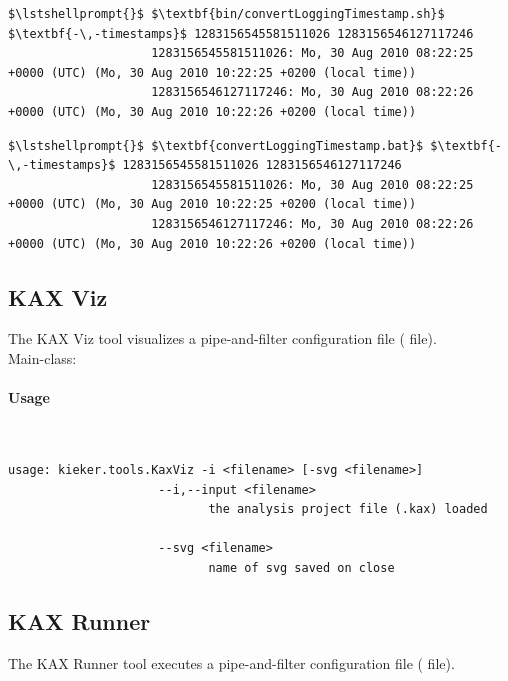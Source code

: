 				\setTextListing
				\begin{lstlisting}[gobble = 10, caption=Execution under UNIX-like systems]
					$\lstshellprompt{}$ $\textbf{bin/convertLoggingTimestamp.sh}$ $\textbf{-\,-timestamps}$ 1283156545581511026 1283156546127117246 
					1283156545581511026: Mo, 30 Aug 2010 08:22:25 +0000 (UTC) (Mo, 30 Aug 2010 10:22:25 +0200 (local time))
					1283156546127117246: Mo, 30 Aug 2010 08:22:26 +0000 (UTC) (Mo, 30 Aug 2010 10:22:26 +0200 (local time))
				\end{lstlisting}

				\begin{lstlisting}[gobble = 10, caption=Execution under Windows]
					$\lstshellprompt{}$ $\textbf{convertLoggingTimestamp.bat}$ $\textbf{-\,-timestamps}$ 1283156545581511026 1283156546127117246 
					1283156545581511026: Mo, 30 Aug 2010 08:22:25 +0000 (UTC) (Mo, 30 Aug 2010 10:22:25 +0200 (local time))
					1283156546127117246: Mo, 30 Aug 2010 08:22:26 +0000 (UTC) (Mo, 30 Aug 2010 10:22:26 +0200 (local time))
				\end{lstlisting}
		
		\subsection{KAX Viz}
		
			The KAX Viz tool visualizes a \KiekerAnalysisPart{} pipe-and-filter configuration file ( file).\\

			\noindent Main-class: {\small {}}

			\paragraph*{Usage}\

				\setTextListing
				\begin{lstlisting}[gobble = 10]
					usage: kieker.tools.KaxViz -i <filename> [-svg <filename>]
					 --i,--input <filename>
							the analysis project file (.kax) loaded

					 --svg <filename>
							name of svg saved on close
				\end{lstlisting}
		
		\subsection{KAX Runner}
		
			The KAX Runner tool executes a \KiekerAnalysisPart{} pipe-and-filter configuration file ( file). \\

